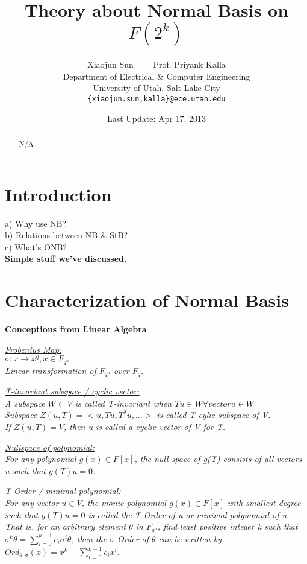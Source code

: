 \documentclass[12pt]{article}
\title{Theory about Normal Basis on $F(2^k)$}
\author{Xiaojun Sun \ \ \ \ Prof. Priyank Kalla\\
\small Department of Electrical \& Computer Engineering\\[-0.8ex]
\small University of Utah, Salt Lake City\\
\small \texttt{\{xiaojun.sun,kalla\}@ece.utah.edu}
}
\date{Last Update: Apr 17, 2013}
\begin{document}
\maketitle

\begin{abstract}
N/A
\end{abstract}

\section{Introduction}

a) Why use NB?\\
b) Relations between NB \& StB?\\
c) What's ONB?\\
{\bf Simple stuff we've discussed.}

\section{Characterization of Normal Basis}
\textbf{Conceptions from Linear Algebra}


\textit{\underline{Frobenius Map:} \\
$\sigma : x \rightarrow x^q, x \in F_{q^n}$ \\
Linear transformation of $F_{q^n}$ over $F_q$. \\
}

\textit{\underline{T-invariant subspace / cyclic vector:} \\
A subspace $W \subset V$ is called T-invariant when $Tu \in W \forall vector u \in W$\\
Subspace $Z(u,T) = <u,Tu,T^2u,...>$ is called T-cylic subspace of V. \\
If $Z(u,T) = V$, then u is called a cyclic vector of V for T.\\
}

\textit{\underline{Nullspace of polynomial:} \\
For any polynomial $g(x) \in F[x]$, the null space of g(T) consists of all vectors u such that
$g(T)u = 0$.\\
}

\textit{\underline{T-Order / minimal polynomial:} \\
For any vector $u \in V$, the monic polynomial $g(x) \in F[x]$ with smallest degree such that
$g(T)u = 0$ is called the T-Order of u or minimal polynomial of u.\\
That is, for an arbitrary element $\theta$ in $F_{q^n}$, find least positive integer k such that
$\sigma^k\theta = \sum_{i=0}^{k-1} c_i\sigma^i\theta$, then the $\sigma$-Order of $\theta$ can be 
written by $Ord_{\theta,\sigma}(x) = x^k - \sum_{i=0}^{k-1} c_ix^i$. \\
}
\end{document}
